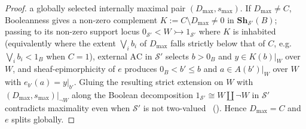 \documentclass[10pt,twoside,openright]{book}
\theoremstyle{crmplain}
\theoremstyle{crmdef}
\theoremstyle{crmremark}
\begin{document}
\begin{proof}
a globally selected internally maximal pair $(D_{\max}, s_{\max})$. If $D_{\max} \neq C$, Booleanness gives a non-zero complement $K := C \setminus D_{\max} \neq 0$ in $\mathbf{Sh}_{\mathcal{S}'}(B)$; passing to its non-zero support locus $0_{\mathcal{S}'} < W \rightarrowtail 1_{\mathcal{S}'}$ where $K$ is inhabited (equivalently where the extent $\bigvee_i b_i$ of $D_{\max}$ falls strictly below that of $C$, e.g.\ $\bigvee_i b_i < 1_B$ when $C = 1$), external $\mathrm{AC}$ in $\mathcal{S}'$ selects $b > 0_B$ and $y \in K(b)|_W$ over $W$, and sheaf-epimorphicity of $e$ produces $0_B < b' \le b$ and $a \in A(b')|_W$ over $W$ with $e_{b'}(a) = y|_{b'}$. Gluing the resulting strict extension on $W$ with $(D_{\max}, s_{\max})|_{\neg W}$ along the Boolean decomposition $1_{\mathcal{S}'} \cong W \amalg \neg W$ in $\mathcal{S}'$ contradicts maximality even when $\mathcal{S}'$ is not two-valued~\cite{Barr74} (\cite[\S D4.5]{Johnstone02}). Hence $D_{\max} = C$ and $e$ splits globally.


\end{proof}
\end{document}
